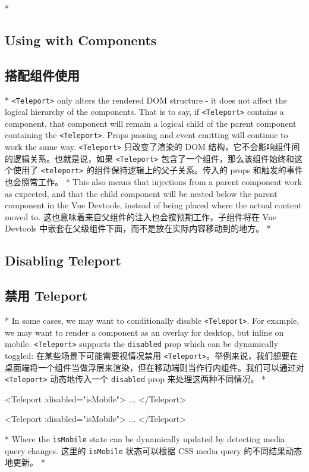 \begin{paracol}{2}
 
\switchcolumn[0]*%
\subsection{Using with Components}
\switchcolumn
\subsection{搭配组件使用}
\switchcolumn[0]*%
\texttt{\textless{}Teleport\textgreater{}} only alters the rendered DOM
structure - it does not affect the logical hierarchy of the components.
That is to say, if \texttt{\textless{}Teleport\textgreater{}} contains a
component, that component will remain a logical child of the parent
component containing the \texttt{\textless{}Teleport\textgreater{}}.
Props passing and event emitting will continue to work the same way.
\switchcolumn
\texttt{\textless{}Teleport\textgreater{}} 只改变了渲染的 DOM
结构，它不会影响组件间的逻辑关系。也就是说，如果
\texttt{\textless{}Teleport\textgreater{}}
包含了一个组件，那么该组件始终和这个使用了
\texttt{\textless{}teleport\textgreater{}}
的组件保持逻辑上的父子关系。传入的 props 和触发的事件也会照常工作。
\switchcolumn[0]*%
This also means that injections from a parent component work as
expected, and that the child component will be nested below the parent
component in the Vue Devtools, instead of being placed where the actual
content moved to.
\switchcolumn
这也意味着来自父组件的注入也会按预期工作，子组件将在 Vue Devtools
中嵌套在父级组件下面，而不是放在实际内容移动到的地方。
\switchcolumn[0]*%
\subsection{Disabling Teleport}
\switchcolumn
\subsection{禁用 Teleport}
\switchcolumn[0]*%
In some cases, we may want to conditionally disable
\texttt{\textless{}Teleport\textgreater{}}. For example, we may want to
render a component as an overlay for desktop, but inline on mobile.
\texttt{\textless{}Teleport\textgreater{}} supports the
\texttt{disabled} prop which can be dynamically toggled:
\switchcolumn
在某些场景下可能需要视情况禁用
\texttt{\textless{}Teleport\textgreater{}}。举例来说，我们想要在桌面端将一个组件当做浮层来渲染，但在移动端则当作行内组件。我们可以通过对
\texttt{\textless{}Teleport\textgreater{}} 动态地传入一个
\texttt{disabled} prop 来处理这两种不同情况。
\switchcolumn[0]*%
\begin{codeHtml}
<Teleport :disabled="isMobile">
  ...
</Teleport>
\end{codeHtml}
\switchcolumn
\begin{codeHtml}
<Teleport :disabled="isMobile">
  ...
</Teleport>
\end{codeHtml}
\switchcolumn[0]*%
Where the \texttt{isMobile} state can be dynamically updated by
detecting media query changes.
\switchcolumn
这里的 \texttt{isMobile} 状态可以根据 CSS media query
的不同结果动态地更新。
\switchcolumn[0]*%

\end{paracol}
